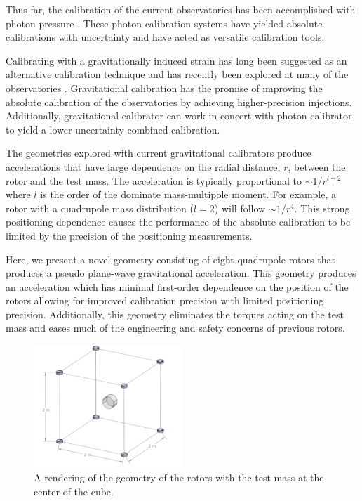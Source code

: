 \documentclass[twocolumn]{revtex4-1}
\begin{document}
Thus far, the calibration of the current observatories has been accomplished with photon pressure \cite{PCal}. These photon calibration systems have yielded absolute calibrations with  uncertainty and have acted as versatile calibration tools. 

Calibrating with a gravitationally induced strain has long been suggested as an alternative calibration technique \cite{hirakawa1980dynamical, kuroda1985experimental, mio1987experimental, astone1991evaluation, astone1998experimental, Matone_2007} and has recently been explored at many of the observatories \cite{Estevez_2018, estevez2021newtonian, PhysRevD.98.022005, ncal}. Gravitational calibration has the promise of improving the absolute calibration of the observatories by achieving higher-precision injections. Additionally, gravitational calibrator can work in concert with photon calibrator to yield a lower uncertainty combined calibration.

The geometries explored with current gravitational calibrators \cite{Estevez_2018, estevez2021newtonian, PhysRevD.98.022005, ncal} produce accelerations that have large dependence on the radial distance, $r$, between the rotor and the test mass. The acceleration is typically proportional to $\sim1/r^{l+2}$ where $l$ is the order of the dominate mass-multipole moment. For example, a rotor with a quadrupole mass distribution ($l=2$) will follow $\sim1/r^4$. This strong positioning dependence causes the performance of the absolute calibration to be limited by the precision of the positioning measurements. 

Here, we present a novel geometry consisting of eight quadrupole rotors that produces a pseudo plane-wave gravitational acceleration. This geometry produces an acceleration which has minimal first-order dependence on the position of the rotors allowing for improved calibration precision with limited positioning precision. Additionally, this geometry eliminates the torques acting on the test mass and eases much of the engineering and safety concerns of previous rotors.

\begin{figure}[!h]
\centering \includegraphics[width=0.5\textwidth]{Super8_Model.pdf}
\caption{A rendering of the geometry of the rotors with the test mass at the center of the cube.}
\label{cad} 
\end{figure}
\end{document}
